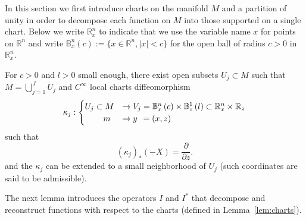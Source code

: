 \documentclass[AHL,Unicode,longabstracts,published]{cedram}
\newcommand{\bbR}{\mathbb{R}}
\newcommand{\bbB}{\mathbb{B}}
\newcommand{\bbR}{\mathbb{R}}
\begin{document}
In this section we first introduce charts on the manifold $M$ and a partition of unity in order to decompose each function on $M$ into those supported on a single chart. Below we write $\bbR_{x}^{n}$ to indicate that we use the variable name $x$ for points on $\bbR^{n}$ and write $\bbB _{x}^{n}(c):=\{ x\in\bbR^{n},|x|<c\} $ for the open ball of radius $c>0$ in $\bbR_{x}^{n}$.

\begin{lemm}\label{lem:charts}
For $c>0$ and $l>0$ small enough, there exist open subsets $U_{j}\subset M$ such that $M=\bigcup_{j=1}^{J}U_{j}$ and $C^{\infty}$ local charts diffeomorphism
\begin{equation}\label{eq:def_kappa_j}
\kappa_{j}:
\begin{cases}
U_{j}\subset M & \rightarrow V_{j}=\bbB _{x}^{n}\left(c\right)\times\bbB _{z}^{1}\left(l\right)\subset\bbR_{x}^{n}\times\bbR_{z}\\
\mkern40mu m & \to y\;\,=\left(x,z\right)
\end{cases}
\end{equation}
such that
\begin{equation}\label{eq:X}
\left(\kappa_{j}\right)_{*}\left(-X\right) =\frac{\partial}{\partial z}.
\end{equation}
and the $\kappa_{j}$ can be extended to a small neighborhood of $U_{j}$ (such coordinates are said to be admissible).
\end{lemm}

The next lemma introduces the operators $I$ and $I^{*}$ that decompose and reconstruct functions with respect to the charts (defined in Lemma~\ref{lem:charts}).
\end{document}
